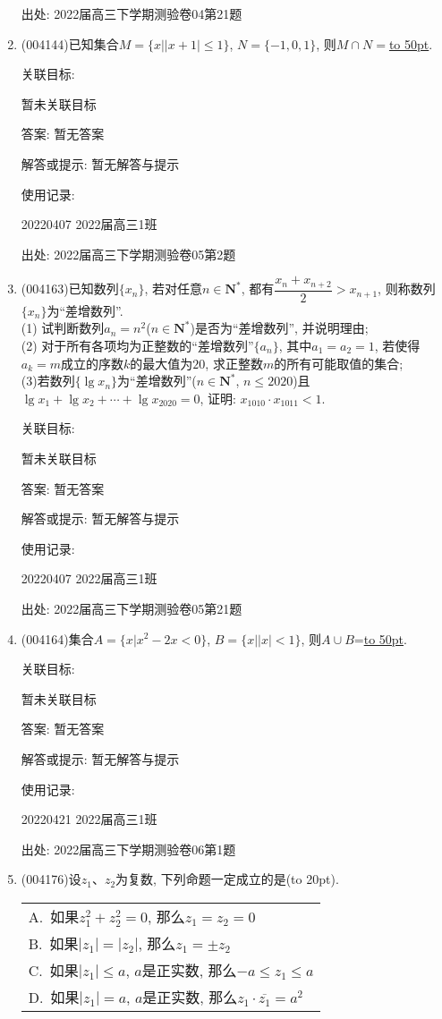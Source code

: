 \documentclass[10pt,a4paper]{article}
\newcommand{\blank}[1]{\underline{\hbox to #1pt{}}}
\newcommand{\bracket}[1]{(\hbox to #1pt{})}
\newcommand{\onech}[4]{\par\begin{tabular}{p{.9\textwidth}}
A.~#1\\
B.~#2\\
C.~#3\\
D.~#4
\end{tabular}}
\begin{document}
\begin{enumerate}[1.]
出处: 2022届高三下学期测验卷04第21题
\item { (004144)}已知集合$M=\{x||x+1|\le 1\}$, $N=\{-1,0,1\}$, 则$M\cap N=$\blank{50}.


关联目标:

暂未关联目标

答案: 暂无答案

解答或提示: 暂无解答与提示

使用记录:

20220407	2022届高三1班	


出处: 2022届高三下学期测验卷05第2题
\item { (004163)}已知数列$\{x_n\}$, 若对任意$n\in \mathbf{N}^*$, 都有$\dfrac{x_n+x_{n+2}}2>x_{n+1}$, 则称数列$\{x_n\}$为``差增数列''.\\
(1) 试判断数列$a_n=n^2$($n\in \mathbf{N}^*$)是否为``差增数列'', 并说明理由;\\
(2) 对于所有各项均为正整数的``差增数列''$\{a_n\}$, 其中$a_1=a_2=1$, 若使得$a_k=m$成立的序数$k$的最大值为$20$, 求正整数$m$的所有可能取值的集合;\\
(3)若数列$\{\lg x_n\}$为``差增数列''($n\in \mathbf{N}^*$, $n\le 2020$)且$\lg x_1+\lg x_2+\cdots +\lg x_{2020}=0$, 证明: $x_{1010}\cdot x_{1011}<1$.


关联目标:

暂未关联目标

答案: 暂无答案

解答或提示: 暂无解答与提示

使用记录:

20220407	2022届高三1班			


出处: 2022届高三下学期测验卷05第21题
\item { (004164)}集合$A=\{x|x^2-2x<0\}$, $B=\{x||x|<1\}$, 则$A\cup B$=\blank{50}.


关联目标:

暂未关联目标

答案: 暂无答案

解答或提示: 暂无解答与提示

使用记录:

20220421	2022届高三1班	


出处: 2022届高三下学期测验卷06第1题
\item { (004176)}设$z_1$、$z_2$为复数, 下列命题一定成立的是\bracket{20}.
\onech{如果$z_1^2+z_2^2=0$, 那么$z_1=z_2=0$}{如果$|z_1 |=|z_2 |$, 那么$z_1=\pm z_2$}{如果$|z_1 |\le a$, $a$是正实数, 那么$-a\le {z_1}\le a$}{如果$|z_1|=a$, $a$是正实数, 那么$z_1\cdot \overline{z_1}=a^2$}



\end{enumerate}
\end{document}
